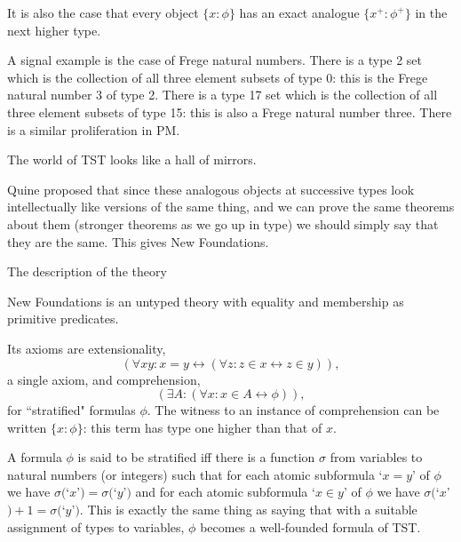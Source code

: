 \documentclass[12pt]{slides}
\begin{document}
\begin{slide}

It is also the case that every object $\{x:\phi\}$ has an exact analogue $\{x^+:\phi^+\}$ in the next higher type.

A signal example is the case of Frege natural numbers.  There is a type 2 set which is the collection of all three element subsets of type 0:  this is the Frege natural number 3 of type 2.  There is a type 17 set which is the collection of all three element subsets of type 15:  this is also a Frege natural number three.  There is a similar proliferation in PM.

The world of TST looks like a hall of mirrors.

Quine proposed that since these analogous objects at successive types look intellectually like versions of the same thing, and we can prove the same theorems about them (stronger theorems as we go up in type) we should simply say that they are the same.  This gives New Foundations.

\end{slide}

\begin{slide}
 {\Large The description of the theory}

New Foundations is an untyped theory with equality and membership as primitive predicates.

Its axioms are extensionality, $$(\forall xy:x=y \leftrightarrow (\forall z:z \in x \leftrightarrow z \in y)),$$ a single axiom, and comprehension, $$(\exists A:(\forall x:x \in A \leftrightarrow \phi)),$$ for ``stratified" formulas $\phi$.  The witness to an instance of comprehension can be written $\{x:\phi\}$:  this term has type one higher than that of $x$.

\end{slide}

\begin{slide}

A formula $\phi$ is said to be stratified iff there is a function $\sigma$ from variables to natural numbers (or integers) such that for each
atomic subformula `$x=y$' of $\phi$ we have $\sigma($`$x$'$)=\sigma($`$y$'$)$ and for each atomic subformula `$x \in y$' of $\phi$ we have $\sigma($`$x$'$)+1 = \sigma($`$y$'$)$.  This is exactly the same thing as saying that with a suitable assignment of types to variables, $\phi$ becomes a well-founded formula of TST.

\end{slide}
\end{document}
